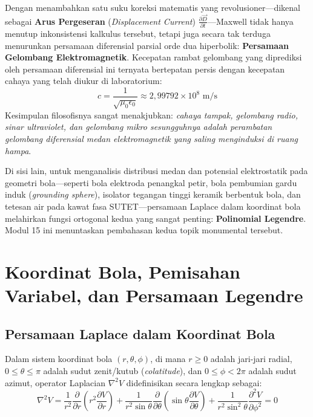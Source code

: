 \documentclass[11pt,a4paper]{article}
\theoremstyle{definition}
\begin{document}
Dengan menambahkan satu suku koreksi matematis yang revolusioner—dikenal sebagai \textbf{Arus Pergeseran} (\textit{Displacement Current}) $\frac{\partial \vec{D}}{\partial t}$—Maxwell tidak hanya menutup inkonsistensi kalkulus tersebut, tetapi juga secara tak terduga menurunkan persamaan diferensial parsial orde dua hiperbolik: \textbf{Persamaan Gelombang Elektromagnetik}. Kecepatan rambat gelombang yang diprediksi oleh persamaan diferensial ini ternyata bertepatan persis dengan kecepatan cahaya yang telah diukur di laboratorium:
\begin{equation}
    c = \frac{1}{\sqrt{\mu_0 \epsilon_0}} \approx 2{,}99792 \times 10^8\text{ m/s}
\end{equation}
Kesimpulan filosofisnya sangat menakjubkan: \textit{cahaya tampak, gelombang radio, sinar ultraviolet, dan gelombang mikro sesungguhnya adalah perambatan gelombang diferensial medan elektromagnetik yang saling menginduksi di ruang hampa}.

Di sisi lain, untuk menganalisis distribusi medan dan potensial elektrostatik pada geometri bola—seperti bola elektroda penangkal petir, bola pembumian gardu induk (\textit{grounding sphere}), isolator tegangan tinggi keramik berbentuk bola, dan tetesan air pada kawat fasa SUTET—persamaan Laplace dalam koordinat bola melahirkan fungsi ortogonal kedua yang sangat penting: \textbf{Polinomial Legendre}. Modul 15 ini menuntaskan pembahasan kedua topik monumental tersebut.

\section{Koordinat Bola, Pemisahan Variabel, dan Persamaan Legendre}

\subsection{Persamaan Laplace dalam Koordinat Bola}
Dalam sistem koordinat bola $(r, \theta, \phi)$, di mana $r \ge 0$ adalah jari-jari radial, $0 \le \theta \le \pi$ adalah sudut zenit/kutub (\textit{colatitude}), dan $0 \le \phi < 2\pi$ adalah sudut azimut, operator Laplacian $\nabla^2 V$ didefinisikan secara lengkap sebagai:
\begin{equation}
    \nabla^2 V = \frac{1}{r^2} \frac{\partial}{\partial r}\left( r^2 \frac{\partial V}{\partial r} \right) + \frac{1}{r^2 \sin\theta} \frac{\partial}{\partial \theta}\left( \sin\theta \frac{\partial V}{\partial \theta} \right) + \frac{1}{r^2 \sin^2\theta} \frac{\partial^2 V}{\partial \phi^2} = 0
    \label{eq:laplace_spherical}
\end{equation}
\end{document}
